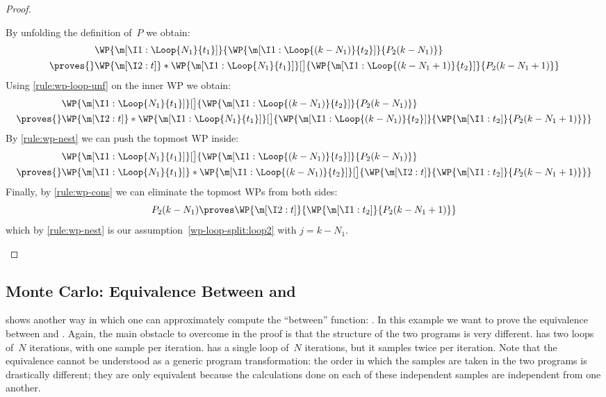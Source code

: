 \documentclass[acmsmall,nonacm,screen,appendix]{acmart}
\begin{document}
\begin{proof}
\begin{casesplit}
  \case[$k>N_1$] By unfolding the definition of~$P$ we obtain:
    \begin{align*}
      &\WP {\m[\I1: \Loop{N_1}{t_1}]}{
        \WP {\m[\I1: \Loop{(k-N_1)}{t_2}]} { P_2(k-N_1) }
      }
      \\ {}\proves{}&
      \WP {\m[\I2: t]}*{
        \WP {\m[\I1: \Loop{N_1}{t_1}]}[\big]{
          \WP {\m[\I1: \Loop{(k-N_1+1)}{t_2}]} { P_2(k-N_1+1) }
        }
      }
    \end{align*}
    Using \ref{rule:wp-loop-unf} on the inner WP we obtain:
    \begin{align*}
      &\WP {\m[\I1: \Loop{N_1}{t_1}]}[\big]{
        \WP {\m[\I1: \Loop{(k-N_1)}{t_2}]} { P_2(k-N_1) }
      }
      \\ {}\proves{}&
      \WP {\m[\I2: t]}*{
        \WP {\m[\I1: \Loop{N_1}{t_1}]}[\big]{
          \WP {\m[\I1: \Loop{(k-N_1)}{t_2}]} {
            \WP{\m[\I1: t_2]}{P_2(k-N_1+1)}
          }
        }
      }
    \end{align*}
    By \ref{rule:wp-nest} we can push the topmost WP inside:
    \begin{align*}
      &\WP {\m[\I1: \Loop{N_1}{t_1}]}[\big]{
        \WP {\m[\I1: \Loop{(k-N_1)}{t_2}]} { P_2(k-N_1) }
      }
      \\ {}\proves{}&
      \WP {\m[\I1: \Loop{N_1}{t_1}]}*{
        \WP {\m[\I1: \Loop{(k-N_1)}{t_2}]}[\big]{
          \WP {\m[\I2: t]} {
            \WP{\m[\I1: t_2]}{P_2(k-N_1+1)}
          }
        }
      }
    \end{align*}
    Finally, by \ref{rule:wp-cons} we can eliminate the topmost WPs from both sides:
    \begin{equation*}
    P_2(k-N_1)
    \proves
    \WP {\m[\I2: t]} {
      \WP{\m[\I1: t_2]}{P_2(k-N_1+1)}
    }
    \end{equation*}
    which by \ref{rule:wp-nest} is our assumption~\eqref{wp-loop-split:loop2}
    with $j=k-N_1$.
  \qedhere
  \end{casesplit}
\end{proof}  

\subsection{Monte Carlo: Equivalence Between  and }

   shows another way in which one can
approximately compute the ``between'' function: .
In this example we want to prove the equivalence between
 and .
Again, the main obstacle to overcome in the proof is that
the structure of the two programs is very different.
 has two loops of~$N$ iterations, with one sample per iteration.
 has a single loop of~$N$ iterations, but it samples twice
per iteration.
Note that the equivalence cannot be understood as a generic program transformation: the order in which the samples are taken in the two programs
is drastically different; they are only equivalent because the calculations
done on each of these independent samples are independent from one another.
\end{document}
